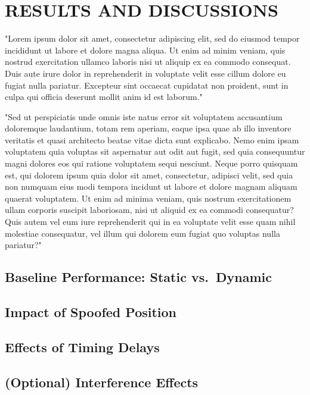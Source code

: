
\section{RESULTS AND DISCUSSIONS} \label{sec:results}


    "Lorem ipsum dolor sit amet, consectetur adipiscing elit, sed do eiusmod tempor incididunt ut labore et dolore magna aliqua. Ut enim ad minim veniam, quis nostrud exercitation ullamco laboris nisi ut aliquip ex ea commodo consequat. Duis aute irure dolor in reprehenderit in voluptate velit esse cillum dolore eu fugiat nulla pariatur. Excepteur sint occaecat cupidatat non proident, sunt in culpa qui officia deserunt mollit anim id est laborum."
    
    "Sed ut perspiciatis unde omnis iste natus error sit voluptatem accusantium doloremque laudantium, totam rem aperiam, eaque ipsa quae ab illo inventore veritatis et quasi architecto beatae vitae dicta sunt explicabo. Nemo enim ipsam voluptatem quia voluptas sit aspernatur aut odit aut fugit, sed quia consequuntur magni dolores eos qui ratione voluptatem sequi nesciunt. Neque porro quisquam est, qui dolorem ipsum quia dolor sit amet, consectetur, adipisci velit, sed quia non numquam eius modi tempora incidunt ut labore et dolore magnam aliquam quaerat voluptatem. Ut enim ad minima veniam, quis nostrum exercitationem ullam corporis suscipit laboriosam, nisi ut aliquid ex ea commodi consequatur? Quis autem vel eum iure reprehenderit qui in ea voluptate velit esse quam nihil molestiae consequatur, vel illum qui dolorem eum fugiat quo voluptas nulla pariatur?"
    
    \subsection{Baseline Performance: Static vs.\ Dynamic}

    \subsection{Impact of Spoofed Position}

    \subsection{Effects of Timing Delays}

    \subsection{(Optional) Interference Effects}
